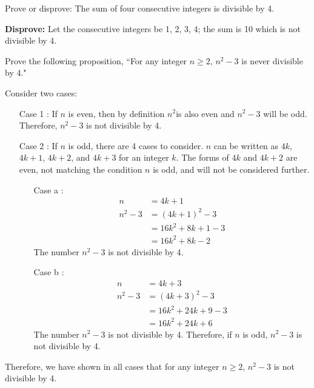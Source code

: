 \begin{questions}
 Prove or disprove: The sum of four consecutive integers is divisible by 4.
    \ifprintanswers
        \vspace{-10pt}
    \fi
\begin{solution}
    \textbf{Disprove:} Let the consecutive integers be 1, 2, 3, 4; the sum is 10 which is not divisible by 4.
\end{solution}


\bonusquestion[4] Prove the following proposition, ``For any integer $n \geq 2$, $n^2-3$ is never divisible by 4."
    \ifprintanswers
        \vspace{-10pt}
    \fi
\begin{solution}
    Consider two cases:
    \begin{itemize}
        \item[Case 1]: If $n$ is even, then by definition $n^2$is also even and $n^2-3$ will be odd.  Therefore, $n^2-3$ is not divisible by 4.
        \item[Case 2]: If $n$ is odd, there are 4 cases to consider. $n$ can be written as $4k$, $4k+1$, $4k+2$, and $4k+3$ for an integer $k$.  The forms of $4k$ and $4k+2$ are even, not matching the condition $n$ is odd, and will not be considered further.
            \begin{itemize}
                \item[Case a]:
                \begin{align*}
                    n &= 4k + 1 \\
                    n^2 - 3 &= (4k + 1)^2 - 3 \\
                        &= 16k^2 + 8k + 1 - 3 \\
                        &= 16k^2 +8k - 2
                \end{align*}
                The number $n^2-3$ is not divisible by 4.
                \item[Case b]:
                \begin{align*}
                    n &= 4k+3 \\
                    n^2 - 3 &= (4k + 3)^2 - 3 \\
                     &= 16k^2 + 24k + 9 - 3 \\
                     &= 16k^2 + 24k + 6
                \end{align*}
                The number $n^2-3$ is not divisible by 4.
                Therefore, if $n$ is odd, $n^2-3$ is not divisible by 4.
            \end{itemize}
        \end{itemize}
        Therefore, we have shown in all cases that for any integer $n \geq 2$, $n^2 - 3$ is not divisible by 4.
\end{solution}

\end{questions}
